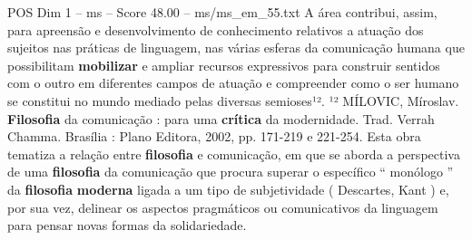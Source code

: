 \begin{textsample}{POS Dim 1 – ms – Score 48.00 – ms/ms\_em\_55.txt}
A área contribui, assim, para apreensão e desenvolvimento de conhecimento relativos a atuação dos sujeitos nas práticas de linguagem, nas várias esferas da comunicação humana que possibilitam \textbf{mobilizar} e ampliar recursos expressivos para construir sentidos com o outro em diferentes campos de atuação e compreender como o ser humano se constitui no mundo mediado pelas diversas semioses¹². ¹² MÍLOVIC, Míroslav. \textbf{Filosofia} da comunicação : para uma \textbf{crítica} da modernidade.
Trad.
Verrah Chamma.
Brasília : Plano Editora, 2002, pp. 171-219 e 221-254.
Esta obra tematiza a relação entre \textbf{filosofia} e comunicação, em que se aborda a perspectiva de uma \textbf{filosofia} da comunicação que procura superar o específico “ monólogo ” da \textbf{filosofia} \textbf{moderna} ligada a um tipo de subjetividade ( Descartes, Kant ) e, por sua vez, delinear os aspectos pragmáticos ou comunicativos da linguagem para pensar novas formas da solidariedade.

\end{textsample}
